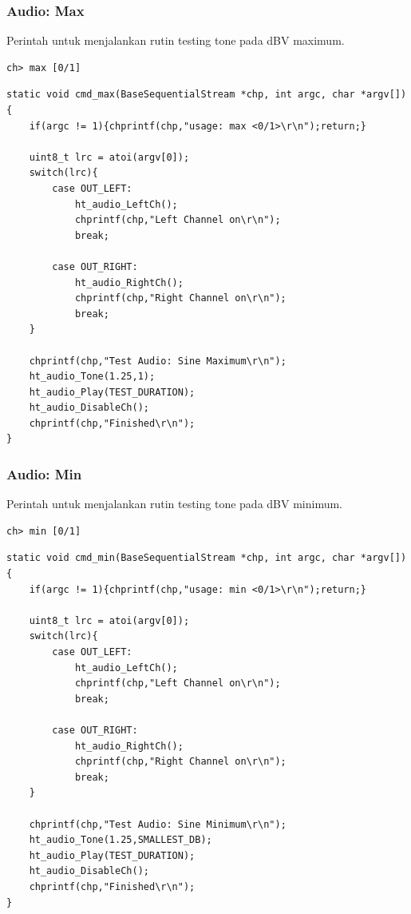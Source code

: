 \documentclass[12pt,]{article}
\begin{document}
	\subsubsection{Audio: Max}
	Perintah untuk menjalankan rutin testing tone pada dBV maximum.
	\begin{verbatim}
ch> max [0/1]
	\end{verbatim}

	\begin{verbatim}
static void cmd_max(BaseSequentialStream *chp, int argc, char *argv[]) {
	if(argc != 1){chprintf(chp,"usage: max <0/1>\r\n");return;}
	
	uint8_t lrc = atoi(argv[0]);
	switch(lrc){
		case OUT_LEFT:
			ht_audio_LeftCh();
			chprintf(chp,"Left Channel on\r\n");
			break;
		
		case OUT_RIGHT:
			ht_audio_RightCh();
			chprintf(chp,"Right Channel on\r\n");
			break;
	}
	
	chprintf(chp,"Test Audio: Sine Maximum\r\n");
	ht_audio_Tone(1.25,1);
	ht_audio_Play(TEST_DURATION);
	ht_audio_DisableCh();
	chprintf(chp,"Finished\r\n");
}
	\end{verbatim}
	
	\subsubsection{Audio: Min}
	Perintah untuk menjalankan rutin testing tone pada dBV minimum.
	\begin{verbatim}
ch> min [0/1]
	\end{verbatim}

	\begin{verbatim}
static void cmd_min(BaseSequentialStream *chp, int argc, char *argv[]) {
	if(argc != 1){chprintf(chp,"usage: min <0/1>\r\n");return;}
	
	uint8_t lrc = atoi(argv[0]);
	switch(lrc){
		case OUT_LEFT:
			ht_audio_LeftCh();
			chprintf(chp,"Left Channel on\r\n");
			break;
		
		case OUT_RIGHT:
			ht_audio_RightCh();
			chprintf(chp,"Right Channel on\r\n");
			break;
	}
	
	chprintf(chp,"Test Audio: Sine Minimum\r\n");
	ht_audio_Tone(1.25,SMALLEST_DB);
	ht_audio_Play(TEST_DURATION);
	ht_audio_DisableCh();
	chprintf(chp,"Finished\r\n");
}
	\end{verbatim}
\end{document}
